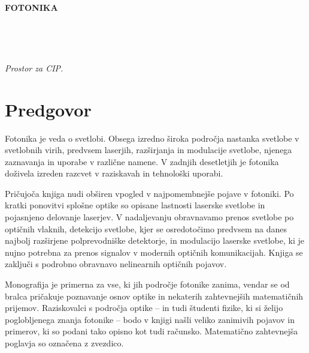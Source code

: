 \documentclass[a4paper,10pt]{book}
\begin{document}

\strut
\vfill
\thispagestyle{empty}
\centerline{\textbf{FOTONIKA}}


\lihastran~
\thispagestyle{empty}
\vfill\vfill
{}
\vfill
{}
\vfill\vfill\vfill
\vfill
{}


\sodastran~
\thispagestyle{empty}

\vfill
\begin{CIP}
   \emph{Prostor za CIP.}
\end{CIP}


\lihastran
\thispagestyle{plain}

\chapter*{Predgovor}
Fotonika je veda o svetlobi. Obsega izredno široka področja nastanka svetlobe
v svetlobnih virih, predvsem laserjih, razširjanja in modulacije svetlobe,
njenega zaznavanja in uporabe v različne namene. V zadnjih 
desetletjih je fotonika doživela izreden razcvet v raziskavah in 
tehnološki uporabi.

Pričujoča knjiga nudi obširen vpogled v najpomembnejše pojave v fotoniki.
Po kratki ponovitvi splošne optike so opisane lastnosti laserske svetlobe
in pojasnjeno delovanje laserjev. V nadaljevanju obravnavamo prenos
svetlobe po optičnih vlaknih, detekcijo svetlobe, kjer se osredotočimo 
predvsem na danes najbolj razširjene polprevodniške detektorje, in 
modulacijo laserske svetlobe, ki je nujno potrebna za prenos signalov
v modernih optičnih komunikacijah. Knjiga se zaključi s podrobno obravnavo 
nelinearnih optičnih pojavov. 

Monografija je primerna za vse, ki jih področje fotonike zanima, 
vendar se od bralca pričakuje poznavanje osnov optike in nekaterih 
zahtevnejših matematičnih prijemov. Raziskovalci s področja optike 
-- in tudi študenti fizike, ki si želijo poglobljenega znanja fotonike -- 
bodo v knjigi našli veliko zanimivih pojavov in primerov, ki so podani tako opisno kot tudi 
računsko. Matematično zahtevnejša poglavja so označena z zvezdico.
\end{document}
